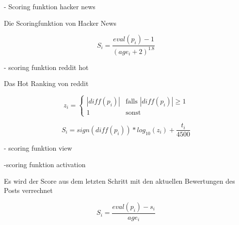 	

- Scoring funktion hacker news

Die Scoringfunktion von Hacker News


\begin{equation}
S_{i} = \frac{eval(p_{i}) - 1}{(age_{i} + 2)^{1.8}}
\end{equation}


- scoring funktion reddit hot

Das Hot Ranking von reddit

\begin{equation}
z_{i}  = \begin{cases}
|diff(p_{i})| &\text{falls $|diff(p_{i})| \geq 1$}\\
1 &\text{sonst}
\end{cases}
\end{equation}

\begin{equation}
S_{i} = sign(diff(p_{i})) * log_{10}(z_{i}) + \frac{t_{i}}{4500}
\end{equation}


- scoring funktion view





-scoring funktion activation

Es wird der Score aus dem letzten Schritt mit den aktuellen Bewertungen des Posts verrechnet 


\begin{equation}
S_{i} = \frac{eval(p_{i}) - s_{i}}{age_{i}}
\end{equation}

	